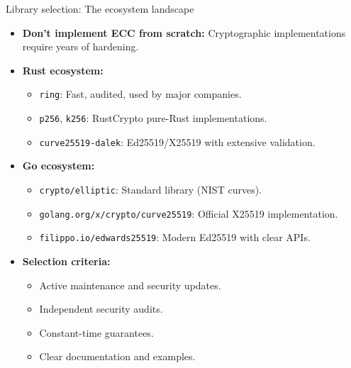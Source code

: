 \documentclass[aspectratio=169, lualatex, handout]{beamer}
\begin{document}
\begin{frame}{Library selection: The ecosystem landscape}
	\begin{itemize}[<+->]
		\item \textbf{Don't implement ECC from scratch:} Cryptographic implementations require years of hardening.
		\item \textbf{Rust ecosystem:}
		      \begin{itemize}
			      \item \texttt{ring}: Fast, audited, used by major companies.
			      \item \texttt{p256}, \texttt{k256}: RustCrypto pure-Rust implementations.
			      \item \texttt{curve25519-dalek}: Ed25519/X25519 with extensive validation.
		      \end{itemize}
		\item \textbf{Go ecosystem:}
		      \begin{itemize}
			      \item \texttt{crypto/elliptic}: Standard library (NIST curves).
			      \item \texttt{golang.org/x/crypto/curve25519}: Official X25519 implementation.
			      \item \texttt{filippo.io/edwards25519}: Modern Ed25519 with clear APIs.
		      \end{itemize}
		\item \textbf{Selection criteria:}
		      \begin{itemize}
			      \item Active maintenance and security updates.
			      \item Independent security audits.
			      \item Constant-time guarantees.
			      \item Clear documentation and examples.
		      \end{itemize}
	\end{itemize}
\end{frame}
\end{document}

